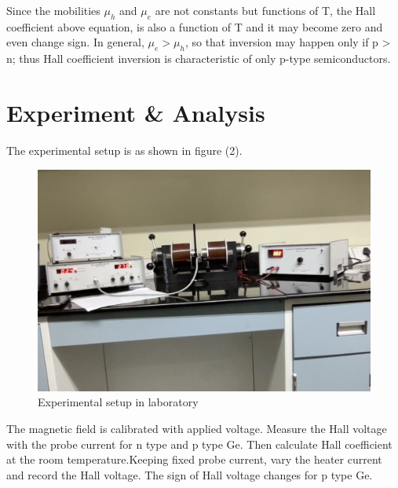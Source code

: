 \documentclass[a4paper, amsfonts, amssymb, amsmath, reprint, showkeys, nofootinbib, twoside]{revtex4-1}
\begin{document}
Since the mobilities $\mu_h$ and $\mu_e$ are not constants but functions of T, the Hall coefficient above equation, is also a function of T and it may become zero and even change sign. In general, $\mu_e>\mu_h$, so that inversion may happen only if p > n; thus Hall coefficient inversion is characteristic
of only p-type semiconductors.

\section{Experiment \& Analysis}
The experimental setup is as shown in figure (2).
\begin{figure}[H]
	\centering
	\includegraphics[scale=0.1]{e} 
	\caption{Experimental setup in laboratory}
	\label{2}
\end{figure}

The magnetic field is calibrated with applied voltage. Measure the Hall voltage with the probe current for n type and p type Ge. Then calculate Hall coefficient at the room temperature.Keeping fixed probe current, vary the heater current and record the Hall voltage. The sign of Hall voltage changes for p type Ge.   
\end{document}
